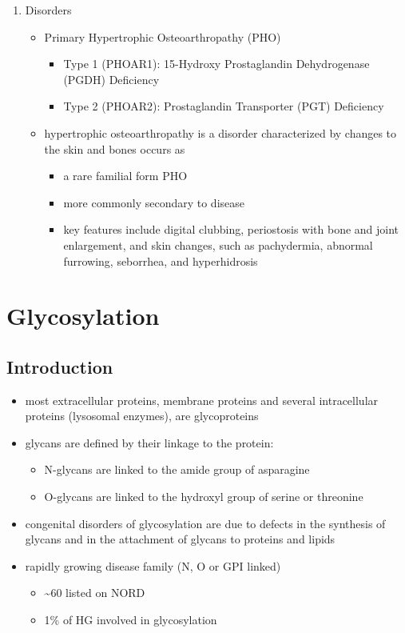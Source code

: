 \documentclass{scrartcl}
\begin{document}
\begin{enumerate}
\item Disorders
\label{sec:orgeaf1e9e}
\begin{itemize}
\item Primary Hypertrophic Osteoarthropathy (PHO)
\begin{itemize}
\item Type 1 (PHOAR1): 15-Hydroxy Prostaglandin Dehydrogenase (PGDH) Deficiency
\item Type 2 (PHOAR2): Prostaglandin Transporter (PGT) Deficiency
\end{itemize}

\item hypertrophic osteoarthropathy is a disorder characterized by changes
to the skin and bones occurs as
\begin{itemize}
\item a rare familial form PHO
\item more commonly secondary to disease
\item key features include digital clubbing, periostosis with bone and
joint enlargement, and skin changes, such as pachydermia, abnormal
furrowing, seborrhea, and hyperhidrosis
\end{itemize}
\end{itemize}
\end{enumerate}
\section{Glycosylation}
\label{sec:orga5b3ba7}
\subsection{Introduction}
\label{sec:org16928cd}
\begin{itemize}
\item most extracellular proteins, membrane proteins and several
intracellular proteins (lysosomal enzymes), are glycoproteins

\item glycans are defined by their linkage to the protein:
\begin{itemize}
\item N-glycans are linked to the amide group of asparagine
\item O-glycans are linked to the hydroxyl group of serine or
threonine
\end{itemize}

\item congenital disorders of glycosylation are due to defects in the
synthesis of glycans and in the attachment of glycans to proteins
and lipids
\item rapidly growing disease family (N, O or GPI linked)
\begin{itemize}
\item \textasciitilde{}60 listed on NORD
\item 1\% of HG involved in glycosylation
\end{itemize}
\end{itemize}
\end{document}
